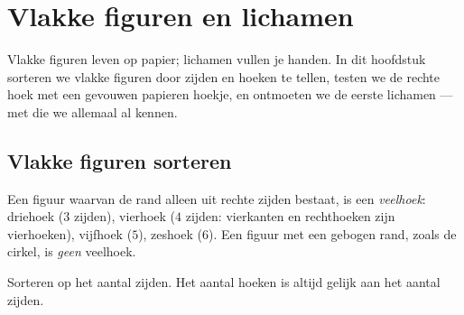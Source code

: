 \chapter{Vlakke figuren en lichamen}\label{ch:g2:shapes}

Vlakke figuren leven op papier; lichamen vullen je handen. In dit
hoofdstuk sorteren we vlakke figuren door zijden en hoeken te tellen,
testen we de rechte hoek met een gevouwen papieren hoekje, en ontmoeten
we de eerste lichamen --- met  die we allemaal al kennen.

\section{Vlakke figuren sorteren}

\begin{definition}\label{def:g2:shapes:sort}
Een figuur waarvan de rand alleen uit rechte zijden bestaat, is een
\emph{veelhoek}: driehoek ($3$ zijden), vierhoek ($4$
zijden: vierkanten en rechthoeken zijn vierhoeken), vijfhoek ($5$),
zeshoek ($6$). Een figuur met een gebogen rand, zoals de cirkel, is
\emph{geen} veelhoek.
\end{definition}

\begin{omfigure}

{\small Sorteren op het aantal zijden. Het aantal hoeken is altijd
gelijk aan het aantal zijden.}
\end{omfigure}

